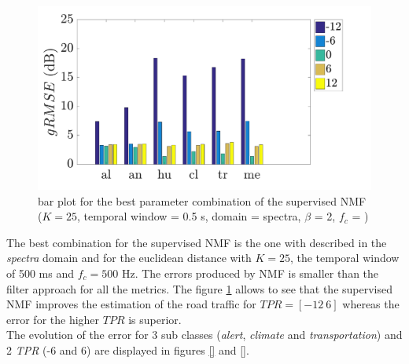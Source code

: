 \documentclass[twocolumn,a4paper,10pt]{article}
\begin{document}
\begin{figure}[hbtp]
\centering
\includegraphics[width=\linewidth]{../image/nmfAmbianceBar.pdf}
\caption{bar plot for the best parameter combination of the supervised NMF ($K = 25$, temporal window = 0.5 s, domain = spectra, $\beta$ = 2, $f_c$ = )}
\label{fig:nmfSupervisedAmbiance}
\end{figure}

The best combination for the supervised NMF is the one with described in the \textit{spectra} domain and for the euclidean distance with $K = 25$, the temporal window of 500 ms and $f_c = 500$ Hz. The errors produced by NMF is smaller than the filter approach for all the metrics. The figure \ref{fig:nmfSupervisedAmbiance} allows to see that the supervised NMF improves the estimation of the road traffic for $TPR = \left[-12~6\right]$ whereas the error for the higher $TPR$ is superior.\\

The evolution of the error for 3 sub classes (\textit{alert}, \textit{climate} and \textit{transportation}) and 2 \textit{TPR} (-6 and 6) are displayed in figures \ref{} and \ref{}.\\
\end{document}
